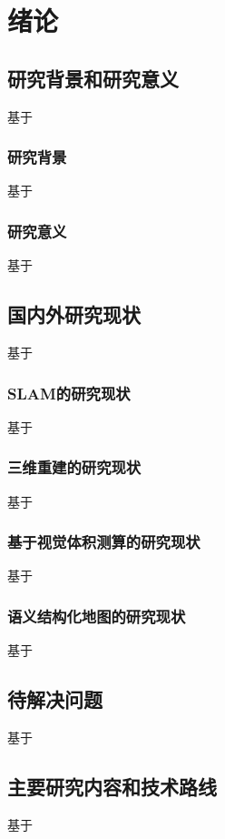 \chapter{绪论}
\label{cha:chap1}
\section{研究背景和研究意义}
\label{sec:1.1}
基于
\subsection{研究背景}
\label{sec:1.1.1}
基于
\subsection{研究意义}
\label{sec:1.1.2}
基于
\section{国内外研究现状}
\label{sec:1.2}
基于
\subsection{SLAM的研究现状}
\label{sec:1.2.1}
基于
\subsection{三维重建的研究现状}
\label{sec:1.2.2}
基于
\subsection{基于视觉体积测算的研究现状}
\label{sec:1.2.3}
基于
\subsection{语义结构化地图的研究现状}
\label{sec:1.2.4}
基于
\section{待解决问题}
\label{sec:1.3}
基于
\section{主要研究内容和技术路线}
\label{sec:1.4}
基于
